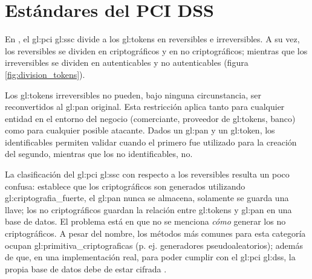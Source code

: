 %
%

\label{sec:estandares}

\section{Estándares del PCI DSS}
\label{sec:pci_dss}

En \cite{pci_tokens}, el \gls{gl:pci} \gls{gl:ssc} divide a los
\glspl{gl:token} en reversibles e irreversibles. A su vez, los reversibles se
dividen en criptográficos y en no criptográficos; mientras que los
irreversibles se dividen en autenticables y no autenticables (figura
\ref{fig:division_tokens}).

Los \glspl{gl:token} irreversibles no pueden, bajo ninguna circunstancia, ser
reconvertidos al \gls{gl:pan} original. Esta restricción aplica tanto para
cualquier entidad en el entorno del negocio (comerciante, proveedor de
\glspl{gl:token}, banco) como para cualquier posible atacante. Dados un
\gls{gl:pan} y un \gls{gl:token}, los identificables permiten validar cuando el
primero fue utilizado para la creación del segundo, mientras que los no
identificables, no.



La clasificación del \gls{gl:pci} \gls{gl:ssc} con respecto a los reversibles
resulta un poco confusa: establece que los criptográficos son generados
utilizando \gls{gl:criptografia_fuerte}, el \gls{gl:pan} nunca se almacena,
solamente se guarda una llave; los no criptográficos guardan la relación entre
\glspl{gl:token} y \gls{gl:pan} en una base de datos. El problema está en que
no se menciona \textit{cómo} generar los no criptográficos. A pesar del nombre,
los métodos más comunes para esta categoría ocupan
\glspl{gl:primitiva_criptografica} (p. ej. generadores pseudoaleatorios);
además de que, en una implementación real, para poder cumplir con el
\gls{gl:pci} \gls{gl:dss}, la propia base de datos debe de estar cifrada
\cite{pci_dss}.

